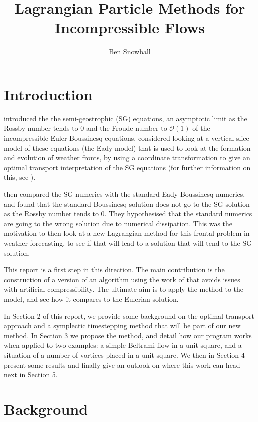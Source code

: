 \documentclass[11pt, oneside]{article}   	%
\title{Lagrangian Particle Methods for Incompressible Flows}
\author{Ben Snowball}
\begin{document}
\maketitle
\section{Introduction}

\cite{hoskins1971atmospheric} introduced the the semi-geostrophic (SG) equations, an asymptotic limit as the Rossby number tends to \(0\) and the Froude number to \(\mathcal{O}(1)\) of the incompressible Euler-Boussinesq equations. \cite{shutts1987parcel} considered looking at a vertical slice model of these equations (the Eady model) that is used to look at the formation and evolution of weather fronts, by using a coordinate transformation to give an optimal transport interpretation of the SG equations (for further information on this, see \cite{cullen2006mathematical}).

\cite{visram2014framework} then compared the SG numerics with the standard Eady-Boussinesq numerics, and found that the standard Boussinesq solution does not go to the SG solution as the Rossby number tends to \(0\). They hypothesised that the standard numerics are going to the wrong solution due to numerical dissipation. This was the motivation to then look at a new Lagrangian method for this frontal problem in weather forecasting, to see if that will lead to a solution that will tend to the SG solution. 

This report is a first step in this direction. The main contribution is the construction of a version of an algorithm using the work of \cite{gallouet2016lagrangian} that avoids issues with artificial compressibility. The ultimate aim is to apply the method to the model, and see how it compares to the Eulerian solution.

In Section 2 of this report, we provide some background on the optimal transport approach and a symplectic timestepping method that will be part of our new method. In Section 3 we propose the method, and detail how our program works when applied to two examples: a simple Beltrami flow in a unit square, and a situation of a number of vortices placed in a unit square. We then in Section 4 present some results and finally give an outlook on where this work can head next in Section 5.


\section{Background}
\end{document}
